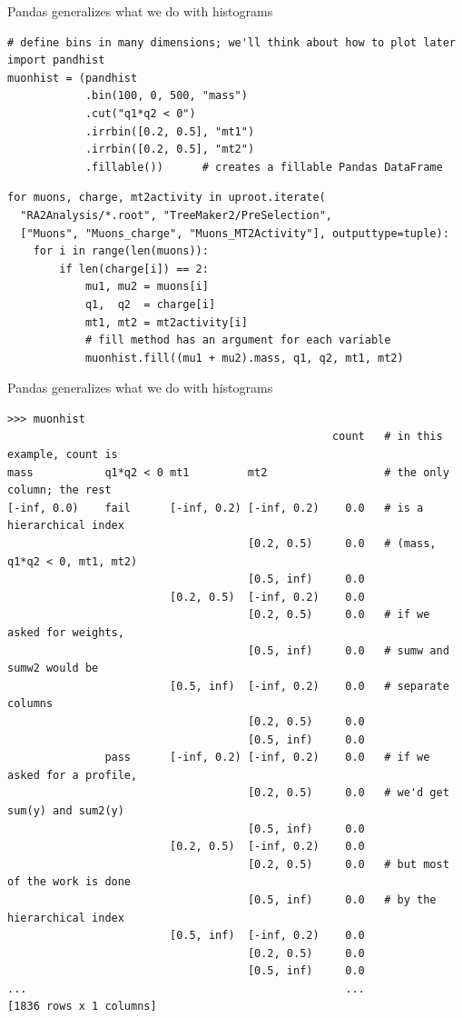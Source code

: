 \documentclass[aspectratio=169]{beamer}
\begin{document}
\begin{frame}[fragile]{Pandas generalizes what we do with histograms}
\small

\begin{verbatim}
# define bins in many dimensions; we'll think about how to plot later
import pandhist
muonhist = (pandhist
            .bin(100, 0, 500, "mass")
            .cut("q1*q2 < 0")
            .irrbin([0.2, 0.5], "mt1")
            .irrbin([0.2, 0.5], "mt2")
            .fillable())      # creates a fillable Pandas DataFrame
\end{verbatim}

\begin{verbatim}
for muons, charge, mt2activity in uproot.iterate(
  "RA2Analysis/*.root", "TreeMaker2/PreSelection",
  ["Muons", "Muons_charge", "Muons_MT2Activity"], outputtype=tuple):
    for i in range(len(muons)):
        if len(charge[i]) == 2:
            mu1, mu2 = muons[i]
            q1,  q2  = charge[i]
            mt1, mt2 = mt2activity[i]
            # fill method has an argument for each variable
            muonhist.fill((mu1 + mu2).mass, q1, q2, mt1, mt2)
\end{verbatim}
\end{frame}

\begin{frame}[fragile]{Pandas generalizes what we do with histograms}
\scriptsize
\begin{verbatim}
>>> muonhist
                                                  count   # in this example, count is
mass           q1*q2 < 0 mt1         mt2                  # the only column; the rest
[-inf, 0.0)    fail      [-inf, 0.2) [-inf, 0.2)    0.0   # is a hierarchical index
                                     [0.2, 0.5)     0.0   # (mass, q1*q2 < 0, mt1, mt2)
                                     [0.5, inf)     0.0
                         [0.2, 0.5)  [-inf, 0.2)    0.0
                                     [0.2, 0.5)     0.0   # if we asked for weights,
                                     [0.5, inf)     0.0   # sumw and sumw2 would be
                         [0.5, inf)  [-inf, 0.2)    0.0   # separate columns
                                     [0.2, 0.5)     0.0
                                     [0.5, inf)     0.0
               pass      [-inf, 0.2) [-inf, 0.2)    0.0   # if we asked for a profile,
                                     [0.2, 0.5)     0.0   # we'd get sum(y) and sum2(y)
                                     [0.5, inf)     0.0
                         [0.2, 0.5)  [-inf, 0.2)    0.0
                                     [0.2, 0.5)     0.0   # but most of the work is done
                                     [0.5, inf)     0.0   # by the hierarchical index
                         [0.5, inf)  [-inf, 0.2)    0.0
                                     [0.2, 0.5)     0.0
                                     [0.5, inf)     0.0
...                                                 ...
[1836 rows x 1 columns]
\end{verbatim}
\end{frame}
\end{document}
